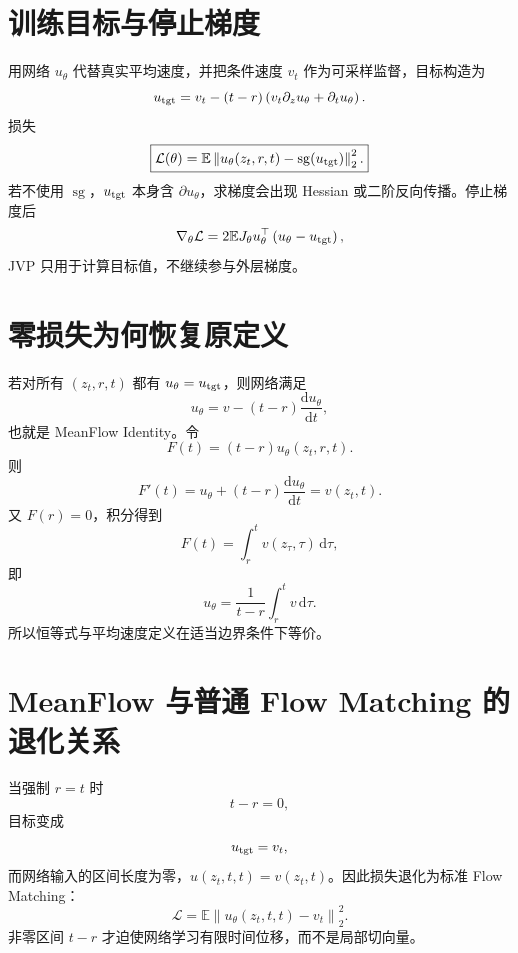 \documentclass[UTF8,12pt,a4paper,fontset=none]{ctexart}
\numberwithin{equation}{section}
\newcommand{\E}{\mathbb{E}}
\newcommand{\Loss}{\mathcal{L}}
\newcommand{\norm}[1]{\left\lVert #1\right\rVert}
\newcommand{\sg}{\operatorname{sg}}
\newcommand{\dd}{\mathrm{d}}
\begin{document}
\section{训练目标与停止梯度}
用网络 $u_\theta$ 代替真实平均速度，并把条件速度 $v_t$ 作为可采样监督，目标构造为
\begin{equation}
 u_{\rm tgt}
 =v_t-(t-r)\left(v_t\partial_z u_\theta+\partial_tu_\theta\right).
\end{equation}
损失
\begin{equation}
 \boxed{\Loss(\theta)=
 \E\norm{u_\theta(z_t,r,t)-\sg(u_{\rm tgt})}_2^2.}
\end{equation}
若不使用 $\sg$，$u_{\rm tgt}$ 本身含 $\partial u_\theta$，求梯度会出现 Hessian 或二阶反向传播。停止梯度后
\begin{equation}
 \nabla_\theta\Loss
 =2\E J_\theta u_\theta^{\top}
 \left(u_\theta-u_{\rm tgt}\right),
\end{equation}
JVP 只用于计算目标值，不继续参与外层梯度。

\section{零损失为何恢复原定义}
若对所有 $(z_t,r,t)$ 都有 $u_\theta=u_{\rm tgt}$，则网络满足
\begin{equation}
 u_\theta=v-(t-r)\frac{\dd u_\theta}{\dd t},
\end{equation}
也就是 MeanFlow Identity。令
\begin{equation}
 F(t)=(t-r)u_\theta(z_t,r,t).
\end{equation}
则
\begin{equation}
 F'(t)=u_\theta+(t-r)\frac{\dd u_\theta}{\dd t}=v(z_t,t).
\end{equation}
又 $F(r)=0$，积分得到
\begin{equation}
 F(t)=\int_r^t v(z_\tau,\tau)\,\dd\tau,
\end{equation}
即
\begin{equation}
 u_\theta=\frac1{t-r}\int_r^t v\,\dd\tau.
\end{equation}
所以恒等式与平均速度定义在适当边界条件下等价。

\section{MeanFlow 与普通 Flow Matching 的退化关系}
当强制 $r=t$ 时
\begin{equation}
 t-r=0,
\end{equation}
目标变成
\begin{equation}
 u_{\rm tgt}=v_t,
\end{equation}
而网络输入的区间长度为零，$u(z_t,t,t)=v(z_t,t)$。因此损失退化为标准 Flow Matching：
\begin{equation}
 \Loss=\E\norm{u_\theta(z_t,t,t)-v_t}_2^2.
\end{equation}
非零区间 $t-r$ 才迫使网络学习有限时间位移，而不是局部切向量。
\end{document}
